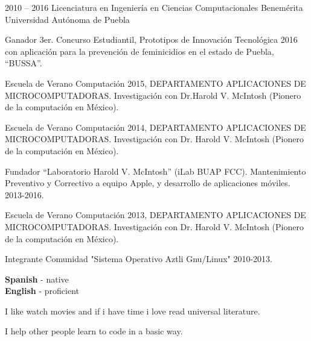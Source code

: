 \documentclass[8pt]{developercv} %
\begin{document}
\begin{entrylist}
	\entry
		{2010 -- 2016}
		{Licenciatura en Ingenier\'ia en Ciencias Computacionales}
		{Benem\'erita Universidad Aut\'onoma de Puebla}
		{

Ganador 3er. Concurso Estudiantil, Prototipos de Innovación
Tecnológica 2016 con aplicación para la prevención de feminicidios en
el estado de Puebla, “BUSSA”.

Escuela de Verano Computación 2015, DEPARTAMENTO APLICACIONES DE MICROCOMPUTADORAS. Investigación con Dr.Harold V. McIntosh (Pionero de la computación en México).

Escuela de Verano Computación 2014, DEPARTAMENTO APLICACIONES DE MICROCOMPUTADORAS. Investigación con Dr. Harold V. McIntosh (Pionero de la computación en México).

Fundador “Laboratorio Harold V. McIntosh” (iLab BUAP FCC).
Mantenimiento Preventivo y Correctivo a equipo Apple, y desarrollo de
aplicaciones móviles. 2013-2016.

Escuela de Verano Computación 2013, DEPARTAMENTO APLICACIONES DE MICROCOMPUTADORAS. Investigación con Dr. Harold V. McIntosh (Pionero de la computación en México).		
		
Integrante Comunidad "Sistema Operativo Aztli Gnu/Linux" 2010-2013.
		}
		
\end{entrylist}


\begin{minipage}[t]{0.3\textwidth}
	\vspace{-\baselineskip} %

	
	\textbf{Spanish} - native\\
	\textbf{English} - proficient\\
\end{minipage}
\hfill
\begin{minipage}[t]{0.3\textwidth}
	\vspace{-\baselineskip} %
	
	
	I like watch movies and if i have time i love read universal literature.
\end{minipage}
\hfill
\begin{minipage}[t]{0.3\textwidth}
	\vspace{-\baselineskip} %
	
	
	I help other people learn to code in a basic way.
\end{minipage}

\end{document}
